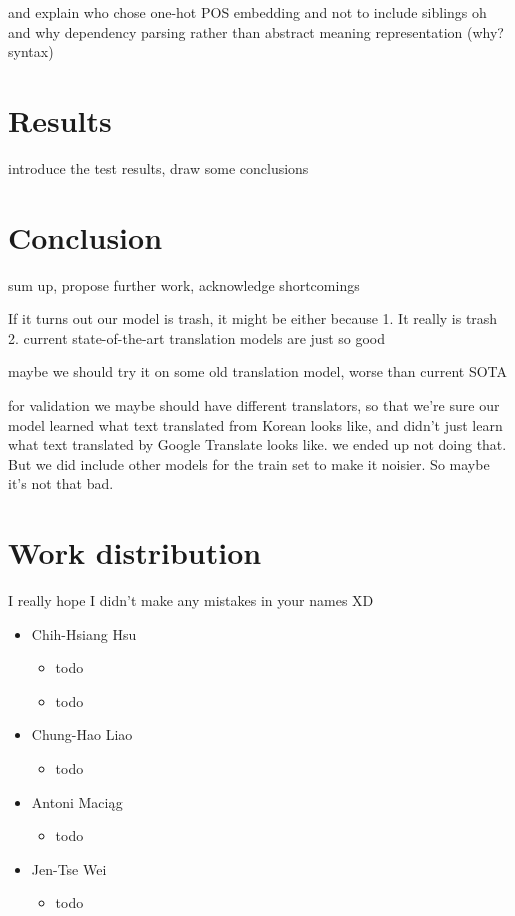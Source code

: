 \documentclass[twocolumn]{article}
\begin{document}
and explain who chose one-hot POS embedding and not to include siblings oh and why dependency parsing rather than abstract meaning representation (why? syntax)


\section*{Results}

introduce the test results, draw some conclusions

\section*{Conclusion}

sum up, propose further work, acknowledge shortcomings

If it turns out our model is trash, it might be either because 1. It really is trash 2. current state-of-the-art translation models are just so good

maybe we should try it on some old translation model, worse than current SOTA

for validation we maybe should have different translators, so that we're sure our model learned what text translated from Korean looks like, and didn't just learn what text translated by Google Translate looks like.
we ended up not doing that. But we did include other models for the train set to make it noisier. So maybe it’s not that bad. 


\section*{Work distribution}

I really hope I didn't make any mistakes in your names XD

\begin{itemize}
	\item Chih-Hsiang Hsu
	\begin{itemize}
		\item todo
		\item todo
	\end{itemize}
	
	\item Chung-Hao Liao
	\begin{itemize}
		\item todo
	\end{itemize}
	
	\item Antoni Maciąg
	\begin{itemize}
		\item todo
	\end{itemize}
	
	\item Jen-Tse Wei
	\begin{itemize}
		\item todo
	\end{itemize}
\end{itemize}
\end{document}
